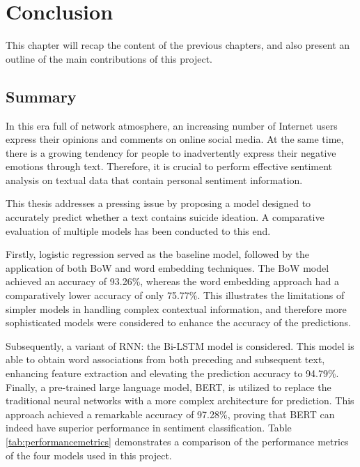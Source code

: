 \documentclass[ %
                    author={Bocheng Wang},
                supervisor={Dr. Qiang Liu},
                    degree={MSc},
                     title={A Research on Identification of Suicide Ideation in Texts with Multiple Models},
                      type={},
                      year={2024}]{dissertation}
\begin{document}

\chapter{Conclusion}
\label{chap:conclusion}
\noindent
This chapter will recap the content of the previous chapters, and also present an outline of the main contributions of this project.

\section{Summary}
\noindent
In this era full of network atmosphere, an increasing number of Internet users express their opinions and comments on online social media. At the same time, there is a growing tendency for people to inadvertently express their negative emotions through text. Therefore, it is crucial to perform effective sentiment analysis on textual data that contain personal sentiment information.

This thesis addresses a pressing issue by proposing a model designed to accurately predict whether a text contains suicide ideation. A comparative evaluation of multiple models has been conducted to this end.

Firstly, logistic regression served as the baseline model, followed by the application of both BoW and word embedding techniques. The BoW model achieved an accuracy of 93.26\%, whereas the word embedding approach had a comparatively lower accuracy of only 75.77\%. This illustrates the limitations of simpler models in handling complex contextual information, and therefore more sophisticated models were considered to enhance the accuracy of the predictions.

Subsequently, a variant of RNN: the Bi-LSTM model is considered. This model is able to obtain word associations from both preceding and subsequent text, enhancing feature extraction and elevating the prediction accuracy to 94.79\%. Finally, a pre-trained large language model, BERT, is utilized to replace the traditional neural networks with a more complex architecture for prediction. This approach achieved a remarkable accuracy of 97.28\%, proving that BERT can indeed have superior performance in sentiment classification. Table \ref{tab:performancemetrics} demonstrates a comparison of the performance metrics of the four models used in this project.
\end{document}
